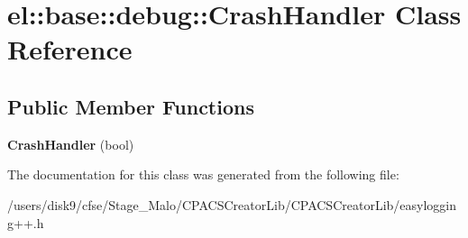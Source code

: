 \hypertarget{classel_1_1base_1_1debug_1_1CrashHandler}{\section{el\-:\-:base\-:\-:debug\-:\-:Crash\-Handler Class Reference}
\label{classel_1_1base_1_1debug_1_1CrashHandler}
}
\subsection*{Public Member Functions}
\begin{DoxyCompactItemize}
\item 
\hypertarget{classel_1_1base_1_1debug_1_1CrashHandler_a74248809ad31620248a0ee60a5fe9894}{{\bfseries Crash\-Handler} (bool)}\label{classel_1_1base_1_1debug_1_1CrashHandler_a74248809ad31620248a0ee60a5fe9894}

\end{DoxyCompactItemize}


The documentation for this class was generated from the following file\-:\begin{DoxyCompactItemize}
\item 
/users/disk9/cfse/\-Stage\-\_\-\-Malo/\-C\-P\-A\-C\-S\-Creator\-Lib/\-C\-P\-A\-C\-S\-Creator\-Lib/easylogging++.\-h\end{DoxyCompactItemize}
